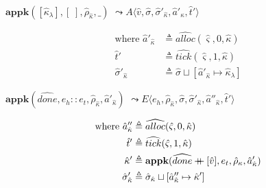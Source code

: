 \documentclass[12pt,draft]{article}
\newcommand\mdoubleplus{\ensuremath{\mathbin{+\mkern-9mu+}}}
\begin{document}
\begin{multicols*}{2}
\begin{align*}
\end{align*}
\begin{center}
  $\textbf{appk}([\hat{\kappa}_\lambda] , [\;] , \hat{\rho}_{\hat{\kappa}} , \_)$
  $\leadsto A\langle \hat{v} , \hat{\sigma} , \hat{\sigma}'_{\hat{\kappa}} , \hat{a}'_{\hat{\kappa}} , \hat{t}'\rangle$
\end{center}
\vspace{-7mm}
\begin{align*}
  \text{where }
  \hat{a}'_{\hat{\kappa}} &\triangleq \widehat{alloc}(\hat{\varsigma}, 0, \hat{\kappa}) \\
  \hat{t}' &\triangleq \widehat{tick}(\hat{\varsigma}, 1, \hat{\kappa}) \\
  \hat{\sigma}'_{\hat{\kappa}} &\triangleq \hat{\sigma} \sqcup
                                 [\hat{a}'_{\hat{\kappa}} \mapsto \hat{\kappa}_\lambda]
\end{align*}
\begin{center}
  $\textbf{appk}(\widehat{done}, e_h::e_t, \hat{\rho}_{\hat{\kappa}}, \hat{a}'_{\hat{\kappa}})$
  $\leadsto E\langle e_h , \hat{\rho}_{\hat{\kappa}} , \hat{\sigma} ,
  \hat{\sigma}'_{\hat{\kappa}} , \hat{a}''_{\hat{\kappa}} , \hat{t}' \rangle$
\end{center}
\vspace{-7mm}
\begin{align*}
  \text{where }
  \hat{a}''_{\hat{\kappa}} &\triangleq \widehat{alloc}(\hat{\varsigma}, 0, \hat{\kappa}) \\
  \hat{t}' &\triangleq \widehat{tick}(\hat{\varsigma}, 1, \hat{\kappa}) \\
  \hat{\kappa}' &\triangleq \textbf{appk}(\widehat{done} \mdoubleplus [\hat{v}],
                  e_t, \hat{\rho}_{\kappa}, \hat{a}'_{\hat{\kappa}}) \\
  \hat{\sigma}'_{\hat{\kappa}} &\triangleq \hat{\sigma}_{\hat{\kappa}} \sqcup
                                 [\hat{a}''_{\hat{\kappa}} \mapsto \hat{\kappa}']
\end{align*}
\end{multicols*}
\end{document}
